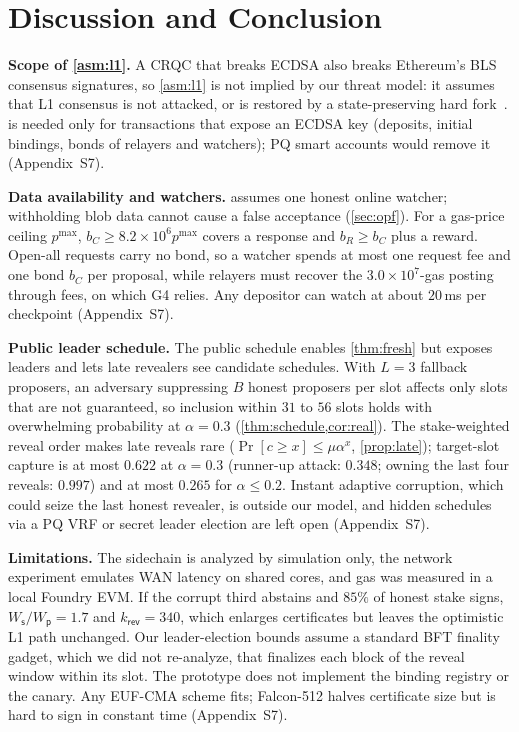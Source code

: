 \documentclass[10pt,journal,compsoc]{IEEEtran}
\theoremstyle{tplain}
\theoremstyle{tdef}
\theoremstyle{remark}
\newcommand{\supp}[1]{Appendix~#1}
\newcommand{\Ws}{W_{\mathsf{s}}}
\newcommand{\Wp}{W_{\mathsf{p}}}
\newcommand{\kr}{k_{\mathsf{rev}}}
\begin{document}
\section{Discussion and Conclusion}\label{sec:discussion}

\noindent\textbf{Scope of \cref{asm:l1}.} A CRQC that breaks ECDSA also breaks Ethereum's BLS consensus signatures, so \cref{asm:l1} is not implied by our threat model: it assumes that L1 consensus is not attacked, or is restored by a state-preserving hard fork~\cite{buterin2024emergency}.  is needed only for transactions that expose an ECDSA key (deposits, initial bindings, bonds of relayers and watchers); PQ smart accounts would remove it (\supp{S7}).

\noindent\textbf{Data availability and watchers.}  assumes one honest online watcher; withholding blob data cannot cause a false acceptance (\cref{sec:opf}). For a gas-price ceiling $p^{\max}$, $b_C\ge 8.2\times10^{6}p^{\max}$ covers a response and $b_R\ge b_C$ plus a reward. Open-all requests carry no bond, so a watcher spends at most one request fee and one bond $b_C$ per proposal, while relayers must recover the $3.0\times10^{7}$-gas posting through fees, on which G4 relies. Any depositor can watch at about $20$\,ms per checkpoint (\supp{S7}).

\noindent\textbf{Public leader schedule.} The public schedule enables \cref{thm:fresh} but exposes leaders and lets late revealers see candidate schedules. With $L=3$ fallback proposers, an adversary suppressing $B$ honest proposers per slot affects only slots that are not guaranteed, so inclusion within $31$ to $56$ slots holds with overwhelming probability at $\alpha=0.3$ (\cref{thm:schedule,cor:real}). The stake-weighted reveal order makes late reveals rare ($\Pr[c\ge x]\le\mu\alpha^x$, \cref{prop:late}); target-slot capture is at most $0.622$ at $\alpha=0.3$ (runner-up attack: $0.348$; owning the last four reveals: $0.997$) and at most $0.265$ for $\alpha\le0.2$. Instant adaptive corruption, which could seize the last honest revealer, is outside our model, and hidden schedules via a PQ VRF or secret leader election are left open (\supp{S7}).

\noindent\textbf{Limitations.} The sidechain is analyzed by simulation only, the network experiment emulates WAN latency on shared cores, and gas was measured in a local Foundry EVM. If the corrupt third abstains and $85\%$ of honest stake signs, $\Ws/\Wp=1.7$ and $\kr=340$, which enlarges certificates but leaves the optimistic L1 path unchanged. Our leader-election bounds assume a standard BFT finality gadget, which we did not re-analyze, that finalizes each block of the reveal window within its slot. The prototype does not implement the binding registry or the canary. Any EUF-CMA scheme fits; Falcon-512 halves certificate size but is hard to sign in constant time (\supp{S7}).
\end{document}
